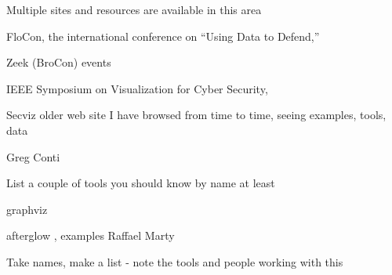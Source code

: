 \documentclass[Screen16to9,17pt]{foils}
\begin{document}
\slide{}


\begin{list1}
\item
\end{list1}




\begin{quote}

\end{quote}

\begin{list2}
  \item Multiple sites and resources are available in this area
  \item FloCon, the international conference on “Using Data to Defend,” 
  \item Zeek (BroCon) events 
  \item IEEE Symposium on Visualization for Cyber Security, 
  \item Secviz older web site I have browsed from time to time, seeing examples, tools, data
  \item Greg Conti 
\item List a couple of tools you should know by name at least
\item graphviz 
\item afterglow , examples Raffael Marty
\end{list2}

\centerline{Take names, make a list - note the tools and people working with this}


\end{document}
